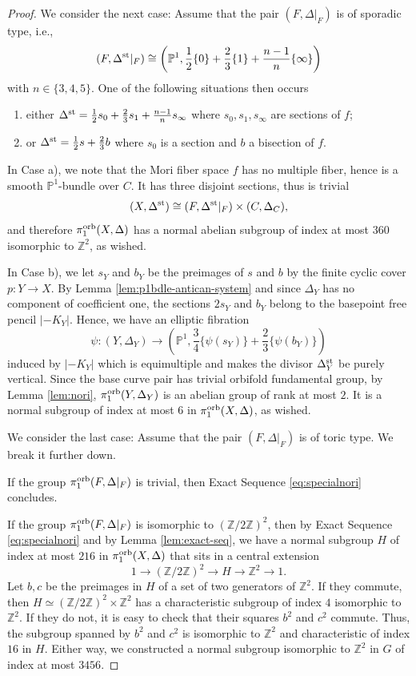 \documentclass{amsart}
\newcommand{\pp}{\mathbb{P}}
\newcommand{\zz}{\mathbb{Z}}
\theoremstyle{definition}
\theoremstyle{remark}
\numberwithin{equation}{section}
\begin{document}
\begin{proof}
\bigskip

We consider the next case: Assume that the pair $(F,\Delta|_F)$ is of sporadic type, i.e., 
$$(F,\Delta^{\rm st}|_F)\cong \left(\pp^1,\frac{1}{2}\{0\}+\frac{2}{3}\{1\}+\frac{n-1}{n}\{\infty\}\right)$$ 
with $n\in\{3,4,5\}$. One of the following situations then occurs
\begin{enumerate}[label=\alph*)]
    \item either $\Delta^{\rm st} = \frac{1}{2}s_0+\frac{2}{3}s_1+\frac{n-1}{n}s_{\infty}$ where $s_0, s_1, s_{\infty}$ are sections of $f$;
    \item or $\Delta^{\rm st} = \frac{1}{2}s + \frac{2}{3}b$ where $s_0$ is a section and $b$ a bisection of $f$.
\end{enumerate}

In Case a), we note that the Mori fiber space $f$ has no multiple fiber, hence is a smooth $\pp^1$-bundle over $C$. It has three disjoint sections, thus is trivial
$$(X,\Delta^{\rm st})\cong (F,\Delta^{\rm st}|_F)\times (C,\Delta_C),$$
and therefore $\pi_1^{\rm orb}(X,\Delta)$ has a normal abelian subgroup of index at most $360$ isomorphic to $\zz^2$, as wished.

In Case b), we let $s_{Y}$ and $b_Y$ be the preimages of $s$ and $b$ by the finite cyclic cover $p:Y\to X$. By Lemma \ref{lem:p1bdle-antican-system} and since $\Delta_Y$ has no component of coefficient one, the sections $2s_Y$ and $b_Y$ belong to the basepoint free pencil $|-K_Y|$. Hence, we have an elliptic fibration
$$\psi:(Y,\Delta_Y)\longrightarrow \left(\pp^1,\frac{3}{4}\{\psi(s_Y)\}+\frac{2}{3}\{\psi(b_Y)\}\right)$$
induced by $|-K_Y|$ which is equimultiple and makes the divisor $\Delta_Y^{\rm st}$ be purely vertical. Since the base curve pair has trivial orbifold fundamental group, by Lemma \ref{lem:nori}, $\pi_1^{\rm orb}(Y,\Delta_Y)$ is an abelian group of rank at most $2$. It is a normal subgroup of index at most $6$ in $\pi_1^{\rm orb}(X,\Delta)$, as wished.

\bigskip

We consider the last case: Assume that the pair $(F,\Delta|_F)$ is of toric type. We break it further down.

\medskip

If the group $\pi_1^{\rm orb}(F,\Delta|_F)$ is trivial, then Exact Sequence \eqref{eq:specialnori} concludes. 

If the group $\pi_1^{\rm orb}(F,\Delta|_F)$ is isomorphic to $(\zz/2\zz)^2$, then by Exact Sequence \eqref{eq:specialnori} and by Lemma \ref{lem:exact-seq}, we have a normal subgroup $H$ of index at most $216$ in $\pi_1^{\rm orb}(X,\Delta)$ that sits in a central extension
$$1\to (\zz/2\zz)^2\to H\to \zz^2\to 1.$$
Let $b,c$ be the preimages in $H$ of a set of two generators of $\zz^2$. If they commute, then $H\simeq(\zz/2\zz)^2\times\zz^2$ has a characteristic subgroup of index $4$ isomorphic to $\zz^2$. If they do not, it is easy to check that their squares $b^2$ and $c^2$ commute. Thus, the subgroup spanned by $b^2$ and $c^2$ is isomorphic to $\zz^2$ and characteristic of index $16$ in $H$. Either way, we constructed a normal subgroup isomorphic to $\zz^2$ in $G$ of index at most $3456$.


\end{proof}
\end{document}
